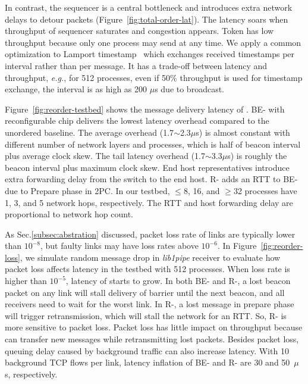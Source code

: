 In contrast, the sequencer is a central bottleneck and introduces extra network delays to detour packets (Figure~\ref{fig:total-order-lat}).
The latency soars when throughput of sequencer saturates and congestion appears.
Token has low throughput because only one process may send at any time.
We apply a common optimization to Lamport timestamp~\cite{lamport1978time} which exchanges received timestamps per interval rather than per message.
It has a trade-off between latency and throughput, \textit{e.g.}, for 512 processes, even if 50\% throughput is used for timestamp exchange, the interval is as high as 200 $\mu$s due to broadcast.





Figure~\ref{fig:reorder-testbed} shows the message delivery latency of \sys{}.
BE-\sys{} with reconfigurable chip delivers the lowest latency overhead compared to the unordered baseline. The average overhead (1.7$\sim$2.3$\mu$s) is almost constant with different number of network layers and processes, which is half of beacon interval plus average clock skew. The tail latency overhead (1.7$\sim$3.3$\mu$s) is roughly the beacon interval plus maximum clock skew.
End host representatives introduce extra forwarding delay from the switch to the end host.
R-\sys{} adds an RTT to BE-\sys{} due to Prepare phase in 2PC.
In our testbed, $\le$8, 16, and $\ge$32 processes have 1, 3, and 5 network hops, respectively.
The RTT and host forwarding delay are proportional to network hop count.

As Sec.\ref{subsec:abstration} discussed, packet loss rate of links are typically lower than $10^{-8}$, but faulty links may have loss rates above $10^{-6}$.
In Figure~\ref{fig:reorder-loss}, we simulate random message drop in \textit{lib1pipe} receiver to evaluate how packet loss affects latency in the testbed with 512 processes.
When loss rate is higher than $10^{-5}$, latency of \sys{} starts to grow. In both BE- and R-\sys{}, a lost beacon packet on any link will stall delivery of barrier until the next beacon, and all receivers need to wait for the worst link. In R-\sys{}, a lost message in prepare phase will trigger retransmission, which will stall the network for an RTT. So, R-\sys{} is more sensitive to packet loss.
Packet loss has little impact on throughput because \sys{} can transfer new messages while retransmitting lost packets.
Besides packet loss, queuing delay caused by background traffic can also increase \sys{} latency. With 10 background TCP flows per link, latency inflation of BE-\sys{} and R-\sys{} are 30 and 50~$\mu$s, respectively.

